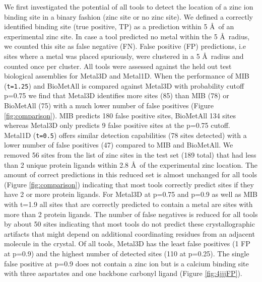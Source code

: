 \documentclass[ lineno,
  9pt]{elife}
\begin{document}
We first investigated the potential of all tools to detect the location of a zinc ion binding site in a binary fashion (zinc site or no zinc site). We defined a correctly identified binding site (true positive, TP) as a prediction within 5 \AA\, of an experimental zinc site. In case a tool predicted no metal within the 5 \AA\, radius, we counted this site as false negative (FN). False positive (FP) predictions, i.e sites where a metal was placed spuriously, were clustered in a 5 \AA\, radius and counted once per cluster. All tools were assessed against the held out test biological assemblies for Metal3D and Metal1D. When the performance of MIB (\texttt{t=1.25}) and BioMetAll is compared against Metal3D with probability cutoff p=0.75 we find that Metal3D identifies more sites (85) than MIB (78) or BioMetAll (75) with a much lower number of false positives (Figure \ref{fig:comparison}).
MIB predicts 180 false positive sites, BioMetAll 134 sites whereas Metal3D only predicts 9 false positive sites at the p=0.75 cutoff. Metal1D (\texttt{t=0.5}) offers similar detection capabilities (78 sites detected) with a lower number of false positives (47) compared to MIB and BioMetAll.
We removed 56 sites from the list of zinc sites in the test set (189 total) that had less than 2 unique protein ligands within 2.8 \AA\, of the experimental zinc location. The amount of correct predictions in this reduced set is almost unchanged for all tools (Figure \ref{fig:comparison}) indicating that most tools correctly predict sites if they have 2 or more protein ligands. For Metal3D at p=0.75 and p=0.9 as well as MIB with t=1.9 all sites that are correctly predicted to contain a metal are sites with more than 2 protein ligands. The number of false negatives is reduced for all tools by about 50 sites indicating that most tools do not predict these crystallographic artifacts that might depend on additional coordinating residues from an adjacent molecule in the crystal. Of all tools, Metal3D has the least false positives (1 FP at p=0.9) and the highest number of detected sites (110 at p=0.25). The single false positive at p=0.9 does not contain a zinc ion but is a calcium binding site with three aspartates and one backbone carbonyl ligand (Figure \ref{fig:4jjjFP}).
\end{document}
